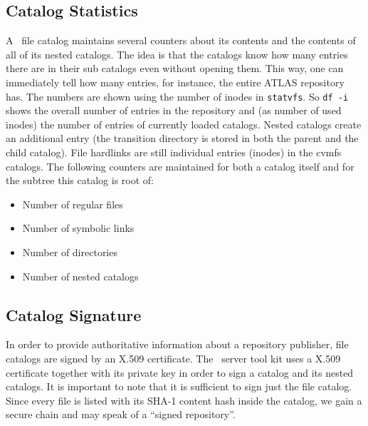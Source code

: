 \subsection{Catalog Statistics}
A \cvmfs\ file catalog maintains several counters about its contents and the contents of all of its nested catalogs. 
The idea is that the catalogs know how many entries there are in their sub catalogs even without opening them.
This way, one can immediately tell how many entries, for instance, the entire ATLAS repository has. 
The numbers are shown using the number of inodes in \texttt{statvfs}. 
So \texttt{df -i} shows the overall number of entries in the repository and (as number of used inodes) the number of entries of currently loaded catalogs. 
Nested catalogs create an additional entry (the transition directory is stored in both the parent and the child catalog). 
File hardlinks are still individual entries (inodes) in the cvmfs catalogs.
The following counters are maintained for both a catalog itself and for the subtree this catalog is root of:
\begin{itemize}
	\item Number of regular files
	\item Number of symbolic links
	\item Number of directories
	\item Number of nested catalogs
\end{itemize}



\subsection{Catalog Signature}
In order to provide authoritative information about a repository publisher, file catalogs are signed by an X.509 certificate.
The \cvmfs\ server tool kit uses a X.509 certificate together with its private key in order to sign a catalog and its nested catalogs.
It is important to note that it is sufficient to sign just the file catalog.
Since every file is listed with its SHA-1 content hash inside the catalog, we gain a secure chain and may speak of a ``signed repository''.

